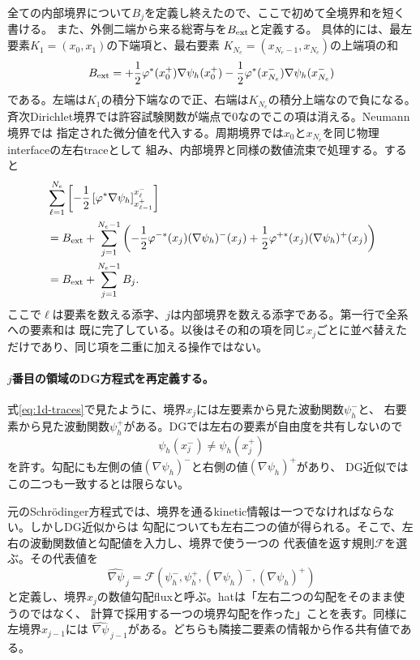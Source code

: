 \documentclass[11pt,a4paper]{article}
\begin{document}
全ての内部境界について$B_j$を定義し終えたので、ここで初めて全境界和を短く書ける。
また、外側二端から来る総寄与を$B_{\rm ext}$と定義する。
具体的には、最左要素$K_1=(x_0,x_1)$の下端項と、最右要素
$K_{N_e}=(x_{N_e-1},x_{N_e})$の上端項の和
\begin{equation}
 B_{\rm ext}=+\frac12\varphi^*(x_0^+)\nabla\psi_h(x_0^+)
 -\frac12\varphi^*(x_{N_e}^-)\nabla\psi_h(x_{N_e}^-)
 \label{eq:external-boundary-contribution}
\end{equation}
である。左端は$K_1$の積分下端なので正、右端は$K_{N_e}$の積分上端なので負になる。
斉次Dirichlet境界では許容試験関数が端点で0なのでこの項は消える。Neumann境界では
指定された微分値を代入する。周期境界では$x_0$と$x_{N_e}$を同じ物理interfaceの左右traceとして
組み、内部境界と同様の数値流束で処理する。すると
\begin{align}
 &\sum_{\ell=1}^{N_e}\left[-\frac12\left[\varphi^*\nabla\psi_h\right]
 _{x_{\ell-1}^+}^{x_\ell^-}\right] \notag\\
 &=B_{\rm ext}
 +\sum_{j=1}^{N_e-1}\left(
 -\frac12\varphi^{-*}(x_j)(\nabla\psi_h)^-(x_j)
 +\frac12\varphi^{+*}(x_j)(\nabla\psi_h)^+(x_j)\right)\\
 &=B_{\rm ext}+\sum_{j=1}^{N_e-1}B_j .
 \label{eq:explicit-reindex-boundaries}
\end{align}
ここで$\ell$は要素を数える添字、$j$は内部境界を数える添字である。第一行で全系への要素和は
既に完了している。以後はその和の項を同じ$x_j$ごとに並べ替えただけであり、同じ項を二重に加える操作ではない。

\paragraph{$j$番目の領域のDG方程式を再定義する。}
式\eqref{eq:1d-traces}で見たように、境界$x_j$には左要素から見た波動関数$\psi_h^-$と、
右要素から見た波動関数$\psi_h^+$がある。DGでは左右の要素が自由度を共有しないので
\begin{equation}
 \psi_h(x_j^-)\ne\psi_h(x_j^+)
 \label{eq:1d-discontinuity}
\end{equation}
を許す。勾配にも左側の値$(\nabla\psi_h)^-$と右側の値$(\nabla\psi_h)^+$があり、
DG近似ではこの二つも一致するとは限らない。

元のSchr\"odinger方程式では、境界を通るkinetic情報は一つでなければならない。しかしDG近似からは
勾配についても左右二つの値が得られる。そこで、左右の波動関数値と勾配値を入力し、境界で使う一つの
代表値を返す規則$\mathcal F$を選ぶ。その代表値を
\begin{equation}
 \widehat{\nabla\psi}_{\,j}=\mathcal F\!\left(
 \psi_h^-,\psi_h^+,(\nabla\psi_h)^-,(\nabla\psi_h)^+\right)
 \label{eq:numerical-derivative-flux}
\end{equation}
と定義し、境界$x_j$の数値勾配fluxと呼ぶ。hatは「左右二つの勾配をそのまま使うのではなく、
計算で採用する一つの境界勾配を作った」ことを表す。同様に左境界$x_{j-1}$には
$\widehat{\nabla\psi}_{\,j-1}$がある。どちらも隣接二要素の情報から作る共有値である。
\end{document}
